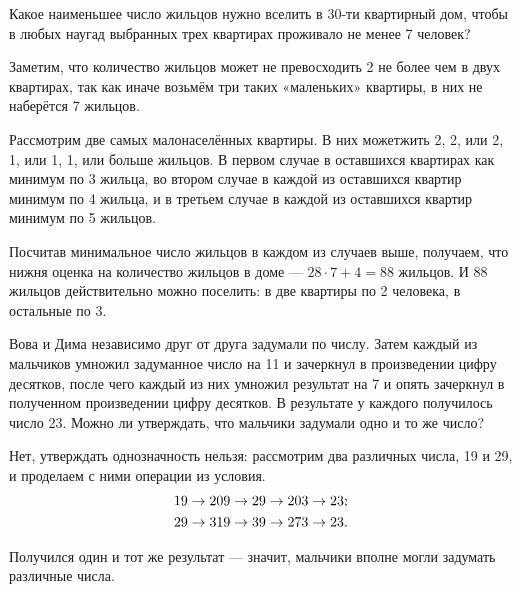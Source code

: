 
\begin{itemize}

	\itA Какое наименьшее число жильцов нужно вселить в 30-ти квартирный дом, чтобы в любых наугад выбранных трех квартирах проживало не менее 7 человек?
	
	\itr Заметим, что количество жильцов может не превосходить 2 не более чем в двух квартирах, так как иначе возьмём три таких «маленьких» квартиры, в них не наберётся 7 жильцов.
	
	Рассмотрим две самых малонаселённых квартиры. В них может\linebreak жить 2, 2, или 2, 1, или 1, 1, или больше жильцов. В первом случае в оставшихся квартирах как минимум по 3 жильца, во втором случае в каждой из оставшихся квартир минимум по 4 жильца, и в третьем случае в каждой из оставшихся квартир минимум по 5 жильцов. 
	
	Посчитав минимальное число жильцов в каждом из случаев выше, получаем, что нижня оценка на количество жильцов в доме — $28 \cdot 7 + 4 = 88$ жильцов. И 88 жильцов действительно можно поселить: в две квартиры по 2 человека, в остальные по 3.

	\itB Вова и Дима независимо друг от друга задумали по числу. Затем каждый из мальчиков умножил задуманное число на 11 и зачеркнул в произведении цифру десятков, после чего каждый из них умножил результат на 7 и опять зачеркнул в полученном произведении цифру десятков. В результате у каждого получилось число 23. Можно ли утверждать, что мальчики задумали одно и то же число?
	
	\itr Нет, утверждать однозначность нельзя: рассмотрим два различных числа, 19 и 29, и проделаем с ними операции из условия.
\begin{align*}
	& 19 \rightarrow 209 \rightarrow  29 \rightarrow 203 \rightarrow 23\scolon \\
	& 29 \rightarrow 319 \rightarrow 39 \rightarrow 273 \rightarrow 23.
\end{align*}

	Получился один и тот же результат — значит, мальчики вполне могли задумать различные числа.

\end{itemize}


